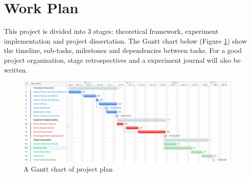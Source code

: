 \section{Work Plan}

This project is divided into 3 stages: theoretical framework, experiment implementation and project dissertation. The Gantt chart below (Figure \ref{fig:gantt}) show the timeline, sub-tasks, milestones and dependencies between tasks. For a good project organisation, stage retrospectives and a experiment journal will also be written.

\begin{figure}[ht]
\includegraphics[width=15cm]{figures/gantt.png}
\caption{A Gantt chart of project plan}
\label{fig:gantt}
\end{figure}

